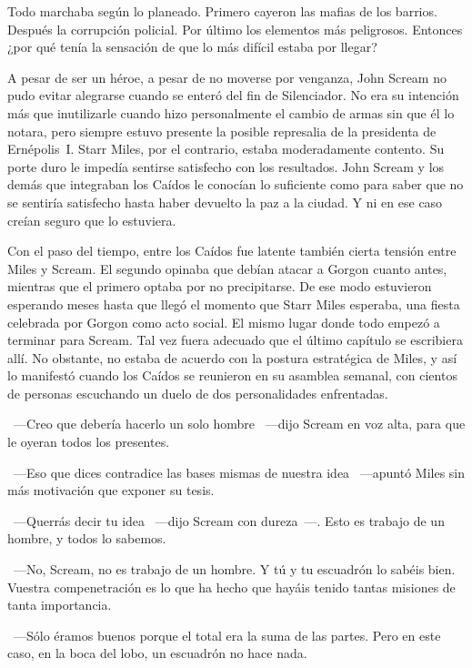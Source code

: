 \noindent
Todo marchaba según lo planeado. Primero cayeron las mafias de los barrios. Después la corrupción policial. Por último los elementos más peligrosos. Entonces ¿por qué tenía la sensación de que lo más difícil estaba por llegar?

\parbreak\noindent
A pesar de ser un héroe, a pesar de no moverse por venganza, John Scream no pudo evitar alegrarse cuando se enteró del fin de Silenciador. No era su intención más que inutilizarle cuando hizo personalmente el cambio de armas sin que él lo notara, pero siempre estuvo presente la posible represalia de la presidenta de Ernépolis~I. Starr Miles, por el contrario, estaba moderadamente contento. Su porte duro le impedía sentirse satisfecho con los resultados. John Scream y los demás que integraban los Caídos le conocían lo suficiente como para saber que no se sentiría satisfecho hasta haber devuelto la paz a la ciudad. Y ni en ese caso creían seguro que lo estuviera.

Con el paso del tiempo, entre los Caídos fue latente también cierta tensión entre Miles y Scream. El segundo opinaba que debían atacar a Gorgon cuanto antes, mientras que el primero optaba por no precipitarse. De ese modo estuvieron esperando meses hasta que llegó el momento que Starr Miles esperaba, una fiesta celebrada por Gorgon como acto social. El mismo lugar donde todo empezó a terminar para Scream. Tal vez fuera adecuado que el último capítulo se escribiera allí. No obstante, no estaba de acuerdo con la postura estratégica de Miles, y así lo manifestó cuando los Caídos se reunieron en su asamblea semanal, con cientos de personas escuchando un duelo de dos personalidades enfrentadas.

~---Creo que debería hacerlo un solo hombre ~---dijo Scream en voz alta, para que le oyeran todos los presentes.

~---Eso que dices contradice las bases mismas de nuestra idea ~---apuntó Miles sin más motivación que exponer su tesis.

~---Querrás decir tu idea ~---dijo Scream con dureza~---. Esto es trabajo de un hombre, y todos lo sabemos.

~---No, Scream, no es trabajo de un hombre. Y tú y tu escuadrón lo sabéis bien. Vuestra compenetración es lo que ha hecho que hayáis tenido tantas misiones de tanta importancia.

~---Sólo éramos buenos porque el total era la suma de las partes. Pero en este caso, en la boca del lobo, un escuadrón no hace nada.

